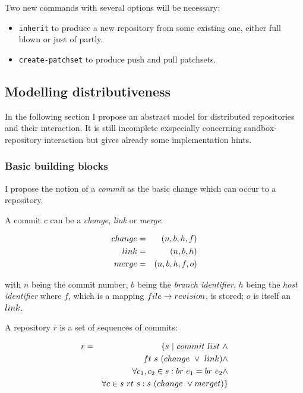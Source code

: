\documentclass[fleqn, german, 10pt, a4paper]{article}
\begin{document}
Two new commands with several options will be necessary:
\begin{itemize}
\item \texttt{inherit} to produce a new repository from some existing one,
either full blown or just of partly.
\item \texttt{create-patchset} to produce push and pull patchsets.
\end{itemize}

\subsection{Modelling distributiveness}

In the following section I propose an abstract model for distributed
repositories and their interaction. It is still incomplete
exspecially concerning sandbox-repository interaction but gives already
some implementation hints.

\subsubsection{Basic building blocks}

I propose the notion of a \emph{commit} as the basic change which can
occur to a repository.

A commit $c$ can be a \emph{change}, \emph{link} or
\emph{merge}:

\begin{eqnarray*}
\mathnormal{change} &=& (n, b, h, f) \\
\mathnormal{link}   &=& (n, b, h) \\
\mathnormal{merge}  &=& (n, b, h, f, o)
\end{eqnarray*}

with $n$ being the commit number, $b$ being the \emph{branch identifier},
$h$ being the \emph{host identifier} where $f$, which is a mapping
$\mathnormal{file} \rightarrow \mathnormal{revision}$, is stored; $o$
is itself an $\mathnormal{link}$.

A repository $r$ is a set of sequences of commits:

\begin{eqnarray*}
r &=& \{s\ |\ \mathnormal{commit}\ \mathnormal{list} \ \wedge \\
&&    \mathnormal{ft}\ s\ (\mathnormal{change} \ \vee \ \mathnormal{link}) \wedge \\
&&    \forall c_1, c_2 \in s: \mathnormal{br}\ e_1 = \mathnormal{br}\ e_2 \wedge \\
&&    \forall c \in s \ \mathnormal{rt}\ s : s\ (\mathnormal{change} \ \vee
      \mathnormal{merget})\}
\end{eqnarray*}
\end{document}
